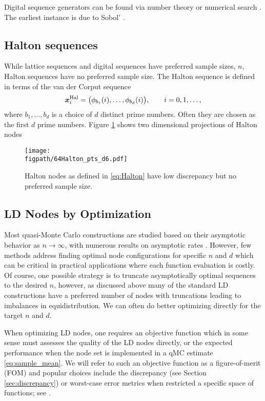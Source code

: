 \documentclass{svproc}
\newcommand{\figpath}{Figures}
\begin{document}
Digital sequence generators can be found via number theory or numerical search \cite{}.  The earliest instance is due to Sobol' \cite{}.

\subsection{Halton sequences} \label{sec:Halton}  While lattice sequences and digital sequences have preferred sample sizes, $n$, Halton sequences have no preferred sample size.  The Halton sequence is defined in terms of the van der Corput sequence
\begin{equation}\label{eq:Halton}
	{\boldsymbol{x}}^{\text{Hal}}_i = \bigl( \phi_{b_1}(i), \ldots, \phi_{b_d}(i) \bigr), \qquad i = 0, 1, \ldots,
\end{equation}
where $b_1, \ldots, b_d$ is a choice of $d$ distinct prime numbers.  Often they are chosen as the first $d$ prime numbers.  Figure \ref{fig:Halton} shows two dimensional projections of Halton nodes

\begin{figure}
	\centering
	\texttt{[image: \\figpath/64Halton\_pts\_d6.pdf]}
	\caption{Halton nodes as defined in \eqref{eq:Halton} have low discrepancy but no preferred sample size. \label{fig:Halton}}
\end{figure}

\subsection{LD Nodes by Optimization}\label{sec:optLD}

Most quasi-Monte Carlo constructions are studied based on their asymptotic behavior as \(n \to \infty\), with numerous results on asymptotic rates \cite{NIED1978QMCBook,NovWoz10a}. However, few methods address finding optimal node configurations for specific \(n\) and \(d\) which can be critical in practical applications where each function evaluation is costly. Of course, one possible strategy is to truncate asymptotically optimal sequences to the desired \(n\), however, as discussed above many of the standard LD constructions have a preferred number of nodes with truncations leading to imbalances in equidistribution. We can often do better optimizing directly for the target \(n\) and \(d\).

When optimizing LD nodes, one requires an objective function which in some sense must assesses the quality of the LD nodes directly, or the expected performance when the node set is implemented in a qMC estimate \eqref{eq:sample_mean}.  We will refer to such an objective function as a figure-of-merit (FOM) and popular choices include the discrepancy (see Section \ref{sec:discrepancy}) or worst-case error metrics when restricted a specific space of functions; see \cite{Hic00a,LatNet}.
\end{document}
